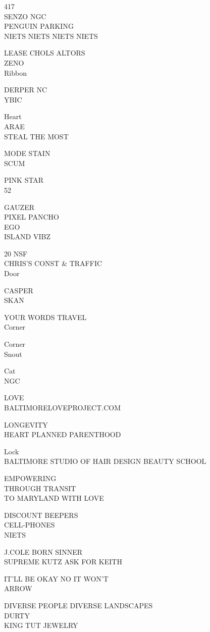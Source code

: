 \documentclass[10pt,letterpaper]{article}
\begin{document}
417\\
SENZO NGC\\
PENGUIN PARKING\\
NIETS NIETS NIETS NIETS

LEASE CHOLS ALTORS\\
ZENO\\
Ribbon

DERPER NC\\
YBIC

Heart\\
ARAE\\
STEAL THE MOST

MODE STAIN\\
SCUM

PINK STAR\\
52

GAUZER\\
PIXEL PANCHO\\
EGO\\
ISLAND VIBZ

20 NSF\\
CHRIS'S CONST \& TRAFFIC\\
Door

CASPER\\
SKAN

YOUR WORDS TRAVEL\\
Corner

Corner\\
Snout

Cat\\
NGC

LOVE\\
BALTIMORELOVEPROJECT.COM

LONGEVITY\\
HEART PLANNED PARENTHOOD

Lock\\
BALTIMORE STUDIO OF HAIR DESIGN BEAUTY SCHOOL

EMPOWERING\\
THROUGH TRANSIT\\
TO MARYLAND WITH LOVE

DISCOUNT BEEPERS\\
CELL{-}PHONES\\
NIETS

J.COLE BORN SINNER\\
SUPREME KUTZ ASK FOR KEITH

IT'LL BE OKAY NO IT WON'T\\
ARROW

DIVERSE PEOPLE DIVERSE LANDSCAPES\\
DURTY\\
KING TUT JEWELRY
\end{document}
